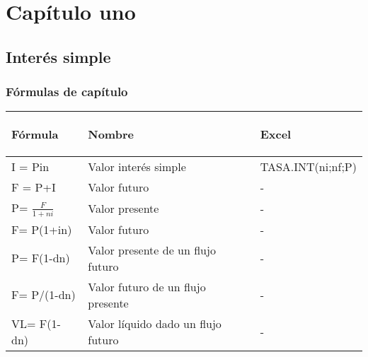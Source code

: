 \part{Capítulo uno}





\chapter{Interés simple}


\section{Fórmulas de capítulo }

\begin{spacing}{1.5}
\begin{center}
\begin{tabular}{ |p{6cm}|p{5cm}| p{4cm}|}
\hline 
\rowcolor{orange!50}
\begin{center}\textbf{Fórmula} \end{center} & \begin{center} \textbf{Nombre}\end{center} & \begin{center} \textbf{Excel} \end{center} \\ \hline                        

I = Pin & Valor interés simple & TASA.INT(ni;nf;P)\\ \hline

F = P+I & Valor futuro &  - \\ \hline 

P= $\frac{F}{1+ni }$ & Valor presente & - \\ \hline

F= P(1+in) & Valor futuro  & - \\ \hline

P= F(1-dn) & Valor presente de un flujo futuro & - \\ \hline

F= P/(1-dn) & Valor futuro de un flujo presente & - \\ \hline

VL= F(1-dn) & Valor líquido dado un flujo futuro & - \\ \hline

 
\end{tabular}
\end{center}
\end{spacing}

